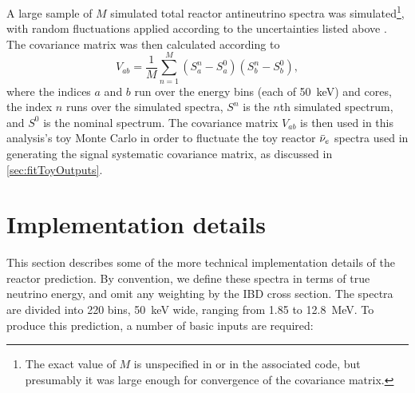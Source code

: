 \documentclass[../thesis.tex]{subfiles}
\begin{document}
A large sample of $M$ simulated total reactor antineutrino spectra was simulated\footnote{The exact value of $M$ is unspecified in \cite{Lewis} or in the associated code, but presumably it was large enough for convergence of the covariance matrix.}, with random fluctuations applied according to the uncertainties listed above \cite{Lewis}. The covariance matrix was then calculated according to
\begin{equation}
  V_{ab} = \frac{1}{M} \sum_{n=1}^M(S^n_{a} - S^0_{a})(S^n_{b} - S^0_{b}),
\end{equation}
where the indices $a$ and $b$ run over the energy bins (each of 50~keV) and cores, the index $n$ runs over the simulated spectra, $S^n$ is the $n$th simulated spectrum, and $S^0$ is the nominal spectrum. The covariance matrix $V_{ab}$ is then used in this analysis's toy Monte Carlo in order to fluctuate the toy reactor $\bar\nu_e$ spectra used in generating the signal systematic covariance matrix, as discussed in \autoref{sec:fitToyOutputs}.

\section{Implementation details}
\label{sec:reactoy}


This section describes some of the more technical implementation details of the reactor prediction. By convention, we define these spectra in terms of true neutrino energy, and omit any weighting by the IBD cross section. The spectra are divided into 220 bins, 50~keV wide, ranging from 1.85 to 12.8~MeV.
To produce this prediction, a number of basic inputs are required:
\end{document}
